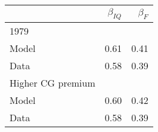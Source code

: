 \begin{tabular}{lrr}
\hline
  & $\beta_{IQ}$  & $\beta_{F}$  \\ 
\hline
1979 &   &   \\ 
Model & 0.61  & 0.41  \\ 
Data & 0.58  & 0.39  \\ 
Higher CG premium &   &   \\ 
Model & 0.60  & 0.42  \\ 
Data & 0.58  & 0.39  \\ 
\hline
\end{tabular}%
